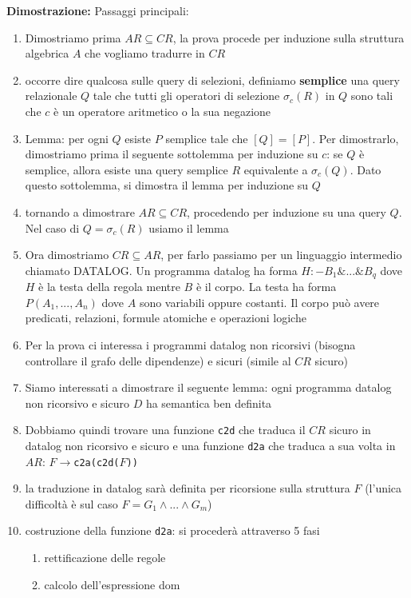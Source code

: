 \documentclass{article}
\begin{document}
\textbf{Dimostrazione:} Passaggi principali:
\begin{enumerate}
    \item Dimostriamo prima $AR\subseteq CR$, la prova procede per induzione sulla struttura algebrica $A$ che vogliamo tradurre in $CR$
    \item occorre dire qualcosa sulle query di selezioni, definiamo \textbf{semplice} una query relazionale $Q$ tale che tutti gli operatori di selezione $\sigma_c(R)$ in $Q$ sono tali che $c$ è un operatore aritmetico o la sua negazione
    \item Lemma: per ogni $Q$ esiste $P$ semplice tale che $[Q]=[P]$. Per dimostrarlo, dimostriamo prima il seguente sottolemma per induzione su $c$: se $Q$ è semplice, allora esiste una query semplice $R$ equivalente a $\sigma_c(Q)$. Dato questo sottolemma, si dimostra il lemma per induzione su $Q$
    \item tornando a dimostrare $AR\subseteq CR$, procedendo per induzione su una query $Q$. Nel caso di $Q =\sigma_c(R)$ usiamo il lemma
    \item Ora dimostriamo $CR\subseteq AR$, per farlo passiamo per un linguaggio intermedio chiamato DATALOG. Un programma datalog ha forma $H:- B_1 \&...\& B_q$ dove $H$ è la testa della regola mentre $B$ è il corpo. La testa ha forma $P(A_1,...,A_n)$ dove $A$ sono variabili oppure costanti. Il corpo può avere predicati, relazioni, formule atomiche e operazioni logiche
    \item Per la prova ci interessa i programmi datalog non ricorsivi (bisogna controllare il grafo delle dipendenze) e sicuri (simile al $CR$ sicuro)
    \item Siamo interessati a dimostrare il seguente lemma: ogni programma datalog non ricorsivo e sicuro $D$ ha semantica ben definita
    \item Dobbiamo quindi trovare una funzione \verb|c2d| che traduca il $CR$ sicuro in datalog non ricorsivo e sicuro e una funzione \verb|d2a| che traduca a sua volta in $AR$: $F\to $\verb|c2a(c2d(|$F$\verb|))|
    \item la traduzione in datalog sarà definita per ricorsione sulla struttura $F$ (l'unica difficoltà è sul caso $F=G_1\land...\land G_m$)
    \item costruzione della funzione \verb|d2a|: si procederà attraverso 5 fasi
    \begin{enumerate}
        \item rettificazione delle regole
        \item calcolo dell'espressione dom

\end{enumerate}
\end{enumerate}
\end{document}
